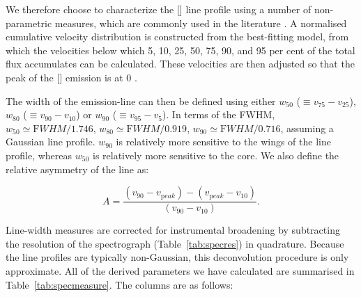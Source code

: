 We therefore choose to characterize the [] line profile using a number of non-parametric measures, which are commonly used in the literature \citep[e.g.][]{zakamska14,zakamska16}. 
A normalised cumulative velocity distribution is constructed from the best-fitting model, from which the velocities below which 5, 10, 25, 50, 75, 90, and 95 per cent of the total flux accumulates can be calculated. 
These velocities are then adjusted so that the peak of the [] emission is at 0 \kms. 

The width of the emission-line can then be defined using either $w_{50}$ ($\equiv v_{75} - v_{25}$), $w_{80}$ ($\equiv v_{90} - v_{10}$) or $w_{90}$ ($\equiv v_{95} - v_{5}$). 
In terms of the FWHM, $w_{50} \simeq {\mathrm FWHM} / 1.746$, $w_{80} \simeq {\mathrm FWHM} / 0.919$, $w_{90} \simeq {\mathrm FWHM} / 0.716$, assuming a Gaussian line profile.  
$w_{90}$ is relatively more sensitive to the wings of the line profile, whereas $w_{50}$ is relatively more sensitive to the core.
We also define the relative asymmetry of the line as:

\begin{equation}
  A = \frac{(v_{90} - v_{\mathrm peak}) - (v_{\mathrm peak} - v_{10})}{(v_{90} - v_{10})}.     
\end{equation} 

Line-width measures are corrected for instrumental broadening by subtracting the resolution of the spectrograph (Table~\ref{tab:specres}) in quadrature.
Because the line profiles are typically non-Gaussian, this deconvolution procedure is only approximate. 
All of the derived parameters we have calculated are summarised in Table~\ref{tab:specmeasure}. 
The columns are as follows: 

